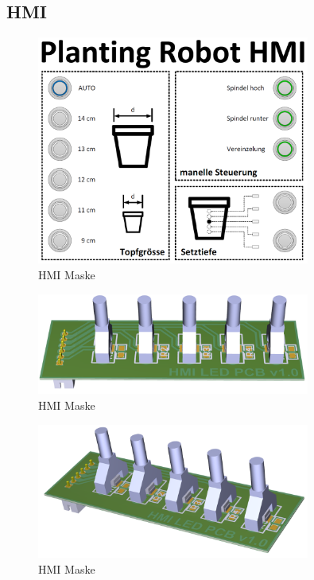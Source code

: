 \subsection{HMI}

\begin{figure}[H]
	\includegraphics[width=0.8\textwidth]{Illustrationen/6-Umsetzung/HMI_Maske.png}
	\caption{HMI Maske}
	\label{fig:HMI_Maske}
\end{figure}

\begin{figure}[H]
	\includegraphics[width=0.8\textwidth]{Illustrationen/6-Umsetzung/LED_PCB_3D.png}
	\caption{HMI Maske}
	\label{fig:HMI_Maske}
\end{figure}

\begin{figure}[H]
	\includegraphics[width=0.8\textwidth]{Illustrationen/6-Umsetzung/LED_PCB_3D_2.png}
	\caption{HMI Maske}
	\label{fig:HMI_Maske}
\end{figure}
